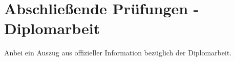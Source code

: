 


\chapter{Abschließende Prüfungen - Diplomarbeit}

Anbei ein Auszug aus offizieller Information bezüglich der Diplomarbeit.



